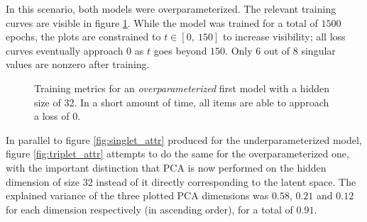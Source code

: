 \documentclass[11pt]{article}
\theoremstyle{remark}
\begin{document}
In this scenario, both models were overparameterized. The relevant training curves are visible in figure \ref{fig:over}. While the model was trained for a total of $1500$ epochs, the plots are constrained to $t \in [0,\ 150]$ to increase visibility; all loss curves eventually approach $0$ as $t$ goes beyond $150$. Only $6$ out of $8$ singular values are nonzero after training.

\begin{figure}%
  \centering
  \caption{Training metrics for an \textit{overparameterized} first model with a hidden size of 32. In a short amount of time, all items are able to approach a loss of 0.}%
  \label{fig:over}%
\end{figure}

In parallel to figure \ref{fig:singlet_attr} produced for the underparameterized model, figure \ref{fig:triplet_attr} attempts to do the same for the overparameterized one, with the important distinction that PCA is now performed on the hidden dimension of size $32$ instead of it directly corresponding to the latent space. The explained variance of the three plotted PCA dimensions was $0.58$, $0.21$ and $0.12$ for each dimension respectively (in ascending order), for a total of $0.91$.
\end{document}
